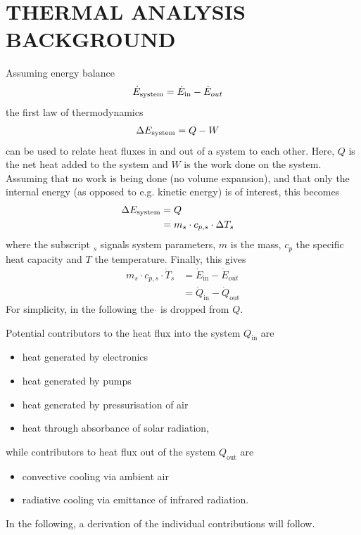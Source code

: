 \chapter{THERMAL ANALYSIS BACKGROUND}
\label{app:thermal_background}
Assuming energy balance
\begin{align}
    \dot{E}_{\mathrm{system}}=\dot{E}_{\mathrm{in}}-\dot{E}_{out}\quad
\end{align}
the first law of thermodynamics 
\begin{align}
    \Delta E_\mathrm{system}=Q-W\quad
\end{align}
can be used to relate heat fluxes in and out of a system to each other. Here, $Q$ is the net heat added to the system and $W$ is the work done on the system. Assuming that no work is being done (no volume expansion), and that only the internal energy (as opposed to e.g. kinetic energy) is of interest, this becomes
\begin{align}
    \Delta {E}_\mathrm{system}&=Q\\ 
    &=m_s\cdot c_{p,s} \cdot \Delta {T}_s\quad
\end{align}
where the subscript $_s$ signals system parameters, $m$ is the mass, $c_p$ the specific heat capacity and $T$ the temperature. Finally, this gives 
\begin{align}
    m_s\cdot c_{p,s} \cdot \dot{T}_s &= \dot{E}_{\mathrm{in}}-\dot{E}_{out}\\ 
    &= \dot{Q}_\mathrm{in}-\dot{Q}_\mathrm{out}
\end{align}
For simplicity, in the following the $\dot{}$ is dropped from $Q$. 

Potential contributors to the heat flux into the system $Q_\mathrm{in}$ are 
\begin{itemize}
    \item heat generated by electronics 
    \item heat generated by pumps 
    \item heat generated by pressurisation of air 
    \item heat through absorbance of solar radiation,
\end{itemize}
while contributors to heat flux out of the system $Q_\mathrm{out}$ are 
\begin{itemize}
    \item convective cooling via ambient air
    \item radiative cooling via emittance of infrared radiation.
\end{itemize}
In the following, a derivation of the individual contributions will follow. 

